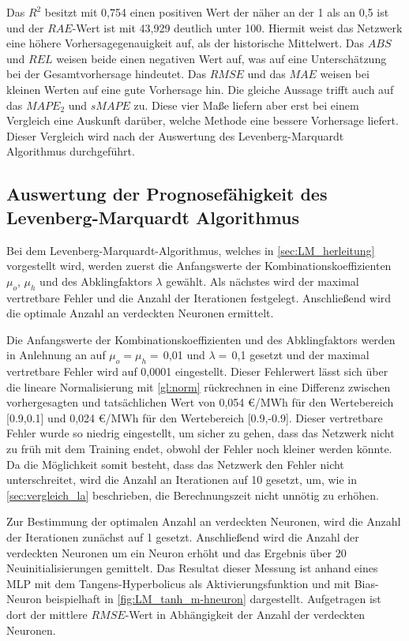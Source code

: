 \newpage

Das $R^2$ besitzt mit 0,754 einen positiven Wert der näher an der 1 als an 0,5 ist und der $RAE$-Wert ist mit 43,929 deutlich unter 100. Hiermit weist das Netzwerk eine höhere Vorhersagegenauigkeit auf, als der historische Mittelwert. Das $ABS$ und $REL$ weisen beide einen negativen Wert auf, was auf eine Unterschätzung bei der Gesamtvorhersage hindeutet. Das $RMSE$ und das $MAE$ weisen bei kleinen Werten auf eine gute Vorhersage hin. Die gleiche Aussage trifft auch auf das $MAPE_2$ und $sMAPE$ zu. Diese vier Maße liefern aber erst bei einem Vergleich eine Auskunft darüber, welche Methode eine bessere Vorhersage liefert. Dieser Vergleich wird nach der Auswertung des Levenberg-Marquardt Algorithmus durchgeführt.



\subsection{Auswertung der Prognosefähigkeit des Levenberg-Marquardt Algorithmus}\label{sec:aus_LM}

Bei dem Levenberg-Marquardt-Algorithmus, welches in \autoref{sec:LM_herleitung} vorgestellt wird, werden zuerst die Anfangswerte der Kombinationskoeffizienten $\mu_o$, $\mu_h$ und des Abklingfaktors $\lambda$ gewählt. Als nächstes wird der maximal vertretbare Fehler und die Anzahl der Iterationen festgelegt. Anschließend wird die optimale Anzahl an verdeckten Neuronen ermittelt.

Die Anfangswerte der Kombinationskoeffizienten und des Abklingfaktors werden in Anlehnung an \citet{Kwak2012} auf $\mu_o=\mu_h=$\,0,01 und $\lambda=$\,0,1 gesetzt und der maximal vertretbare Fehler wird auf 0,0001 eingestellt. Dieser Fehlerwert lässt sich über die lineare Normalisierung mit \autoref{gl:norm} rückrechnen in eine Differenz zwischen vorhergesagten und tatsächlichen Wert von 0,054 €/MWh für den Wertebereich [0.9,0.1] und 0,024 €/MWh für den Wertebereich [0.9,-0.9]. Dieser vertretbare Fehler wurde so niedrig eingestellt, um sicher zu gehen, dass das Netzwerk nicht zu früh mit dem Training endet, obwohl der Fehler noch kleiner werden könnte. Da die Möglichkeit somit besteht, dass das Netzwerk den Fehler nicht unterschreitet, wird die Anzahl an Iterationen auf 10 gesetzt, um, wie in \autoref{sec:vergleich_la} beschrieben, die Berechnungszeit nicht unnötig zu erhöhen. 

Zur Bestimmung der optimalen Anzahl an verdeckten Neuronen, wird die Anzahl der Iterationen zunächst auf 1 gesetzt. Anschließend wird die Anzahl der verdeckten Neuronen um ein Neuron erhöht und das Ergebnis über 20 Neuinitialisierungen gemittelt. Das Resultat dieser Messung ist anhand eines MLP mit dem Tangens-Hyperbolicus als Aktivierungsfunktion und mit Bias-Neuron beispielhaft in \autoref{fig:LM_tanh_m-hneuron} dargestellt. Aufgetragen ist dort der mittlere $RMSE$-Wert in Abhängigkeit der Anzahl der verdeckten Neuronen.

